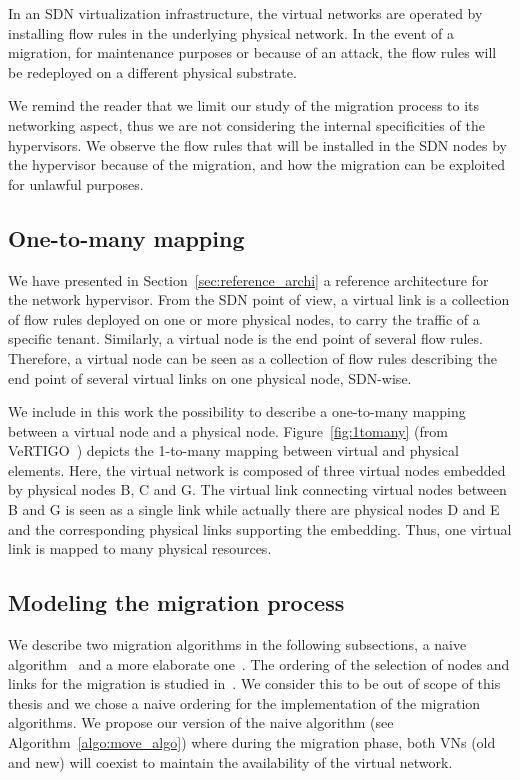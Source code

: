 \label{sec:model-migration}
In an SDN virtualization infrastructure, the virtual networks are operated by installing flow rules in the underlying physical network.
In the event of a migration, for maintenance purposes or because of an attack, the flow rules will be redeployed on a different physical substrate.

We remind the reader that we limit our study of the migration process to its networking aspect, thus we are not considering the internal specificities of the hypervisors.
We observe the flow rules that will be installed in the SDN nodes by the hypervisor because of the migration, and how the migration can be exploited for unlawful purposes.



\subsection{One-to-many mapping}
We have presented in Section~\ref{sec:reference_archi} a reference architecture for the network hypervisor.
From the SDN point of view, a virtual link is a collection of flow rules deployed on one or more physical nodes, to carry the traffic of a specific tenant.
Similarly, a virtual node is the end point of several flow rules.
Therefore, a virtual node can be seen as a collection of flow rules describing the end point of several virtual links on one physical node, SDN-wise.

We include in this work the possibility to describe a one-to-many mapping between a virtual node and a physical node.
Figure~\ref{fig:1tomany} (from VeRTIGO~\cite{VeRTIGO-Corin2012a}) depicts the 1-to-many mapping between virtual and physical elements. Here, the virtual network is composed of three virtual nodes embedded by physical nodes B, C and G.
The virtual link connecting virtual nodes between B and G is seen as a single link while actually there are physical nodes D and E and the corresponding physical links supporting the embedding.
Thus, one virtual link is mapped to many physical resources.

\subsection{Modeling the migration process}
We describe two migration algorithms in the following subsections, a naive algorithm~\cite{Lime-Ghorbani2014} and a more elaborate one~\cite{vnm-lo2013}. 
The ordering of the selection of nodes and links for the migration is studied in~\cite{vnm-lo2013}. 
We consider this to be out of scope of this thesis and we chose a naive ordering for the implementation of the migration algorithms.
We propose our version of the naive algorithm (see Algorithm~\ref{algo:move_algo}) where during the migration phase, both VNs (old and new) will coexist to maintain the availability of the virtual network.


